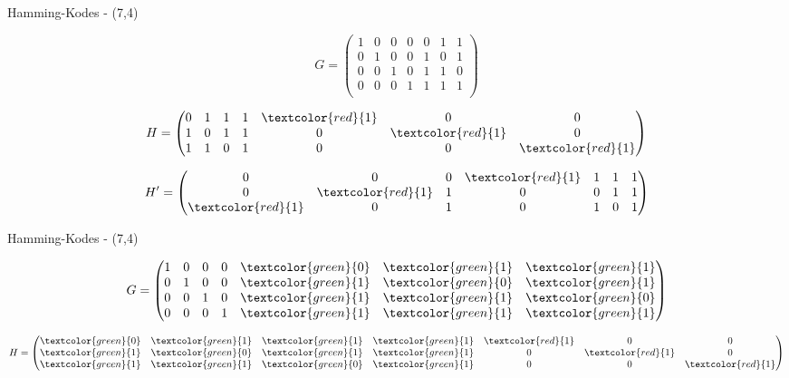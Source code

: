 \documentclass[xcolor=dvipsnames]{beamer}
\begin{document}
\begin{frame}{Hamming-Kodes - (7,4)}

$$G = \begin{pmatrix}
1 & 0 & 0 & 0 & 0 & 1 & 1 \\
0 & 1 & 0 & 0 & 1 & 0 & 1 \\
0 & 0 & 1 & 0 & 1 & 1 & 0 \\
0 & 0 & 0 & 1 & 1 & 1 & 1 \\
\end{pmatrix}$$

\pause
$$H = \begin{pmatrix}
0 & 1 & 1 & 1 & \textcolor{red}{1} & 0 & 0 \\
1 & 0 & 1 & 1 & 0 & \textcolor{red}{1} & 0 \\
1 & 1 & 0 & 1 & 0 & 0 & \textcolor{red}{1}\\
\end{pmatrix}$$

\pause
$$H' = \begin{pmatrix}
0 & 0 & 0 & \textcolor{red}{1} & 1 & 1 & 1 \\
0 & \textcolor{red}{1} & 1 & 0 & 0 & 1 & 1 \\
\textcolor{red}{1} & 0 & 1 & 0 & 1 & 0 & 1 \\
\end{pmatrix}$$
\end{frame}

\begin{frame}{Hamming-Kodes - (7,4)}

$$G = \begin{pmatrix}
1 & 0 & 0 & 0 & \textcolor{green}{0} & \textcolor{green}{1} & \textcolor{green}{1} \\
0 & 1 & 0 & 0 & \textcolor{green}{1} & \textcolor{green}{0} & \textcolor{green}{1} \\
0 & 0 & 1 & 0 & \textcolor{green}{1} & \textcolor{green}{1} & \textcolor{green}{0} \\
0 & 0 & 0 & 1 & \textcolor{green}{1} & \textcolor{green}{1} & \textcolor{green}{1} \\
\end{pmatrix}$$

$$H = \begin{pmatrix}
\textcolor{green}{0} & \textcolor{green}{1} & \textcolor{green}{1} & \textcolor{green}{1} & \textcolor{red}{1} & 0 & 0 \\
\textcolor{green}{1} & \textcolor{green}{0} & \textcolor{green}{1} & \textcolor{green}{1} & 0 & \textcolor{red}{1} & 0 \\
\textcolor{green}{1} & \textcolor{green}{1} & \textcolor{green}{0} & \textcolor{green}{1} & 0 & 0 & \textcolor{red}{1}\\
\end{pmatrix}$$

\end{frame}
\end{document}
